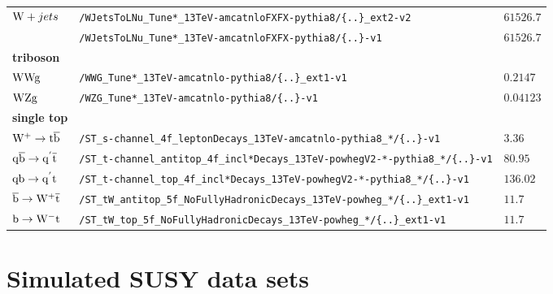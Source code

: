 \begin{table}[tb]
\begin{tabular}[width=\textwidth]{lll}
  $\mathrm{W}+jets$                                       & \verb|/WJetsToLNu_Tune*_13TeV-amcatnloFXFX-pythia8/{..}_ext2-v2| & $61526.7$                                 \\
                                                   & \verb|/WJetsToLNu_Tune*_13TeV-amcatnloFXFX-pythia8/{..}-v1| & $61526.7$                                 \\
  \textbf{triboson}                                &                         &                                           \\
  $\mathrm{W}\mathrm{W}\mathrm{g}$                                      & \verb|/WWG_Tune*_13TeV-amcatnlo-pythia8/{..}_ext1-v1| & $0.2147$                                  \\
  $\mathrm{W}\mathrm{Z}\mathrm{g}$                                      & \verb|/WZG_Tune*_13TeV-amcatnlo-pythia8/{..}-v1| & $0.04123$                                 \\
  \textbf{single top}                              &                         &                                           \\
  $\mathrm{W^+}\to\mathrm{t}\overline{\mathrm{b}}$                             & \verb|/ST_s-channel_4f_leptonDecays_13TeV-amcatnlo-pythia8_*/{..}-v1| & $3.36$                                    \\
  $\mathrm{q}\overline{\mathrm{b}}\to\mathrm{q}^{'}\overline{\mathrm{t}}$                    & \verb|/ST_t-channel_antitop_4f_incl*Decays_13TeV-powhegV2-*-pythia8_*/{..}-v1| & $80.95$                                   \\
  $\mathrm{q}\mathrm{b}\to\mathrm{q}^{'}\mathrm{t}$                      & \verb|/ST_t-channel_top_4f_incl*Decays_13TeV-powhegV2-*-pythia8_*/{..}-v1| & $136.02$                                  \\
  $\overline{\mathrm{b}}\to\mathrm{W^+}\overline{\mathrm{t}}$                            & \verb|/ST_tW_antitop_5f_NoFullyHadronicDecays_13TeV-powheg_*/{..}_ext1-v1| & $11.7$                                    \\
  $\mathrm{b}\to\mathrm{W^-}\mathrm{t}$                              & \verb|/ST_tW_top_5f_NoFullyHadronicDecays_13TeV-powheg_*/{..}_ext1-v1| & $11.7$                                    \\
  \hline
 \end{tabular}
\end{table}

\FloatBarrier
\section*{Simulated SUSY data sets}


